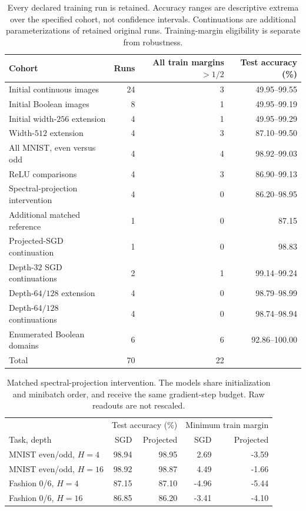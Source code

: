 \begin{table}[t]
\centering\small
\begin{tabular}{lrrr}
\toprule
Cohort & Runs & All train margins $>1/2$ & Test accuracy (\%) \\
\midrule
Initial continuous images & 24 & 3 & 49.95--99.55 \\
Initial Boolean images & 8 & 1 & 49.95--99.19 \\
Initial width-$256$ extension & 4 & 1 & 49.95--99.29 \\
Width-$512$ extension & 4 & 3 & 87.10--99.50 \\
All MNIST, even versus odd & 4 & 4 & 98.92--99.03 \\
ReLU comparisons & 4 & 3 & 86.90--99.13 \\
Spectral-projection intervention & 4 & 0 & 86.20--98.95 \\
Additional matched reference & 1 & 0 & 87.15 \\
Projected-SGD continuation & 1 & 0 & 98.83 \\
Depth-$32$ SGD continuations & 2 & 1 & 99.14--99.24 \\
Depth-$64/128$ extension & 4 & 0 & 98.79--98.99 \\
Depth-$64/128$ continuations & 4 & 0 & 98.74--98.94 \\
Enumerated Boolean domains & 6 & 6 & 92.86--100.00 \\
\midrule
Total & 70 & 22 & \\
\bottomrule
\end{tabular}
\caption{Every declared training run is retained. Accuracy ranges are descriptive extrema over the specified cohort, not confidence intervals. Continuations are additional parameterizations of retained original runs. Training-margin eligibility is separate from robustness.}
\label{tab:training-cohorts}
\end{table}
\begin{table}[t]
\centering\small
\begin{tabular}{lrrrr}
\toprule
 & \multicolumn{2}{c}{Test accuracy (\%)} & \multicolumn{2}{c}{Minimum train margin} \\
Task, depth & SGD & Projected & SGD & Projected \\
\midrule
MNIST even/odd, $H=4$ & 98.94 & 98.95 & 2.69 & -3.59 \\
MNIST even/odd, $H=16$ & 98.92 & 98.87 & 4.49 & -1.66 \\
Fashion 0/6, $H=4$ & 87.15 & 87.10 & -4.96 & -5.44 \\
Fashion 0/6, $H=16$ & 86.85 & 86.20 & -3.41 & -4.10 \\
\bottomrule
\end{tabular}
\caption{Matched spectral-projection intervention. The models share initialization and minibatch order, and receive the same gradient-step budget. Raw readouts are not rescaled.}
\label{tab:projected-training}
\end{table}
